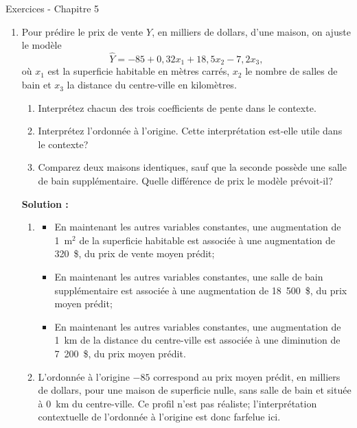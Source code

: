 \documentclass[letter, 11pt]{article}
\newcommand{\prof}[1]{\begin{professeur}\color{blue} {\bf Solution :} #1 \end{professeur}}
\begin{document}
\vspace*{0.01 cm}
\begin{center}
{\Large Exercices - Chapitre 5}
\end{center}




\begin{enumerate}[leftmargin=*, wide, label=\bf Exercice \arabic*:]

\item Pour prédire le prix de vente $Y$, en milliers de dollars, d'une maison, on
ajuste le modèle
\[
  \widehat{Y}=-85+0{,}32x_1+18{,}5x_2-7{,}2x_3,
\]
où $x_1$ est la superficie habitable en mètres carrés, $x_2$ le nombre de
salles de bain et $x_3$ la distance du centre-ville en kilomètres.

\begin{enumerate}[label=\alph*)]
  \item Interprétez chacun des trois coefficients de pente dans le contexte.
  \item Interprétez l'ordonnée à l'origine. Cette interprétation est-elle
        utile dans le contexte?
  \item Comparez deux maisons identiques, sauf que la seconde possède une
        salle de bain supplémentaire. Quelle différence de prix le modèle
        prévoit-il?
\end{enumerate}


\prof{  \begin{enumerate}[label=\alph*)]
  \item 
  \begin{itemize}
    \item En maintenant les autres variables constantes, une augmentation de 1~m$^2$ de la superficie habitable est associée
          à une augmentation de  320~\$, du
          prix de vente moyen prédit;
    \item En maintenant les autres variables constantes, une salle de bain supplémentaire est associée à une augmentation de
           18~500~\$, du prix moyen prédit;
    \item En maintenant les autres variables constantes, une augmentation de 1~km de la distance du centre-ville est associée
          à une diminution de 7~200~\$, du prix
          moyen prédit.
  \end{itemize}

  \item L'ordonnée à l'origine $-85$ correspond au prix moyen prédit, en
        milliers de dollars, pour une maison de superficie nulle, sans salle
        de bain et située à 0~km du centre-ville. Ce profil n'est pas réaliste;
        l'interprétation contextuelle de l'ordonnée à l'origine est donc farfelue ici.


\end{enumerate}}
\end{enumerate}
\end{document}
